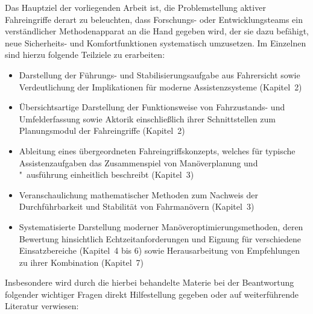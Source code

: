 Das Hauptziel der vorliegenden Arbeit ist, die Problemstellung aktiver Fahreingriffe derart zu beleuchten, dass Forschungs- oder Entwicklungsteams ein verständlicher Methodenapparat an die Hand gegeben wird, der sie dazu befähigt, neue Sicherheits- und Komfortfunktionen systematisch umzusetzen. Im Einzelnen sind hierzu folgende Teilziele zu erarbeiten: 
\begin{itemize}
	\item Darstellung der Führungs- und Stabilisierungsaufgabe aus Fahrersicht sowie Verdeutlichung der Implikationen für moderne Assistenzsysteme (Kapitel~2)
	\item Übersichtsartige Darstellung der Funktionsweise von Fahrzustands- und Umfelderfassung sowie Aktorik einschließlich ihrer Schnittstellen zum Planungsmodul der Fahreingriffe (Kapitel~2)
	\item Ableitung eines übergeordneten Fahreingriffskonzepts, welches für typische Assistenzaufgaben das Zusammenspiel von Manöverplanung und "~ausführung einheitlich beschreibt (Kapitel~3)
\item Veranschaulichung mathematischer Methoden zum Nachweis der Durchführbarkeit und Stabilität von Fahrmanövern (Kapitel~3)
	\item Systematisierte Darstellung moderner Manöveroptimierungsmethoden, deren Bewertung hinsichtlich Echtzeitanforderungen und Eignung für verschiedene Einsatzbereiche (Kapitel~4 bis 6) sowie Herausarbeitung von Empfehlungen zu ihrer Kombination (Kapitel~7) 
\end{itemize}
Insbesondere wird durch die hierbei behandelte Materie bei der Beantwortung folgender wichtiger Fragen direkt Hilfestellung gegeben oder auf weiterführende Literatur verwiesen:
